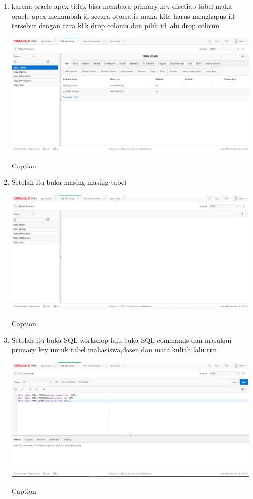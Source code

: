 ﻿\documentclass{article}
\begin{document}
\begin{enumerate}
        \item karena oracle apex tidak bisa membaca primary key disetiap tabel maka oracle apex menambah id secara otomatis maka kita harus menghapus id tersebut dengan cara klik drop colomn dan pilih id lalu drop colomn
    \begin{center}
        \centering
        \includegraphics[scale=0.4]{figures/10.PNG}
        \caption{Caption}
        \label{fig:my_label}
    \end{center}
    
            \item Setelah itu buka masing masing tabel 
    \begin{center}
        \centering
        \includegraphics[scale=0.4]{figures/7.PNG}
        \caption{Caption}
        \label{fig:my_label}
    \end{center}
    
                \item Setelah itu buka SQL workshop lalu buka SQL commands dan masukan primary key untuk tabel mahasiswa,dosen,dan mata kuliah lalu run
    \begin{center}
        \centering
        \includegraphics[scale=0.4]{figures/11.PNG}
        \caption{Caption}
        \label{fig:my_label}
    \end{center}
    

\end{enumerate}
\end{document}
